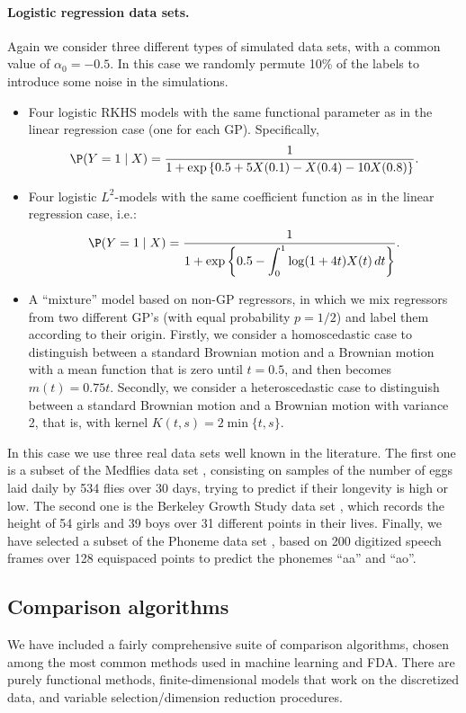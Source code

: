 \paragraph{Logistic regression data sets.} Again we consider three different types of simulated data sets,  with a common value of \(\alpha_0=-0.5\). In this case we randomly permute 10\% of the labels to introduce some noise in the simulations.
\begin{itemize}
  \item Four logistic RKHS models with the same functional parameter as in the linear regression case (one for each GP). Specifically,
  \[
  \P(Y=1\mid X) = \frac{1}{1 + \exp\left\{0.5 +5X(0.1) - X(0.4) - 10X(0.8)\right\}}.
  \]
  \item Four logistic \(L^2\)-models with the same coefficient function as in the linear regression case, i.e.:
  \[
  \P(Y=1\mid X) = \frac{1}{\displaystyle 1 + \exp\left\{0.5 - \int_0^1 \log(1+4t) X(t)\, dt\right\}}.
  \]
  \item A ``mixture'' model based on non-GP regressors, in which we mix regressors from two different GP's (with equal probability \(p=1/2\)) and label them according to their origin. Firstly, we consider a homoscedastic case to distinguish between a standard Brownian motion and a Brownian motion with a mean function that is zero until \(t=0.5\), and then becomes \(m(t)=0.75t\). Secondly, we consider a heteroscedastic case to distinguish between a standard Brownian motion and a Brownian motion with variance 2, that is, with kernel \(K(t,s)=2\min\{t,s\}\).
\end{itemize}
In this case we use three real data sets well known in the literature. The first one is a subset of the Medflies data set \citep{carey1998relationship}, consisting on samples of the number of eggs laid daily by 534 flies over 30 days, trying to predict if their longevity is high or low. The second one is the Berkeley Growth Study data set \citep{tuddenham1954physical}, which records the height of 54 girls and 39 boys over 31 different points in their lives. Finally, we have selected a subset of the Phoneme data set \citep{hastie1995penalized}, based on 200 digitized speech frames over 128 equispaced points to predict the phonemes ``aa'' and ``ao''.

\subsection*{Comparison algorithms}

We have included a fairly comprehensive suite of comparison algorithms, chosen among the most common methods used in machine learning and FDA. There are purely functional methods, finite-dimensional models that work on the discretized data, and variable selection/dimension reduction procedures.

